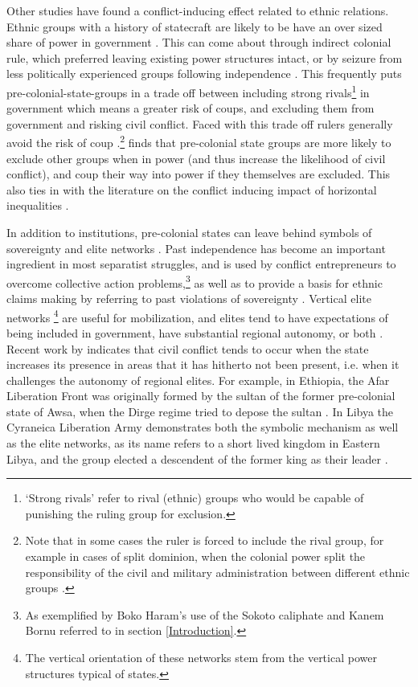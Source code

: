 Other studies have found a conflict-inducing effect related to ethnic relations.
Ethnic groups with a history of statecraft are likely to be have an over sized
share of power in government \citep{Wucherpfennig2016}. This can come about
through indirect colonial rule, which preferred leaving existing power
structures intact, or by seizure from less politically experienced groups
following independence \citep{Paine2019}. This frequently puts
pre-colonial-state-groups in a trade off between including strong
rivals\footnote{`Strong rivals' refer to rival (ethnic) groups who would be
capable of punishing the ruling group for exclusion.} in government which means
a greater risk of coups, and excluding them from government and risking civil
conflict. Faced with this trade off rulers generally avoid the risk of coup
\citep{Paine2019, Powell_2014, Roessler_2011}.\footnote{Note that in some cases
	the ruler is forced to include the rival group, for example in cases of
split dominion, when the colonial power split the responsibility of the civil
and military administration between different ethnic groups \citep{Paine2019}.}
\citet{Paine2019} finds that pre-colonial state groups are more likely to
exclude other groups when in power (and thus increase the likelihood of civil
conflict), and coup their way into power if they themselves are excluded. This
also ties in with the literature on the conflict inducing impact of horizontal
inequalities \citep{CEDERMAN_2011}.

In addition to institutions, pre-colonial states can leave behind symbols of
sovereignty and elite networks \citep{Wishman}. Past independence has become an
important ingredient in most separatist struggles, and is used by conflict
entrepreneurs to overcome collective action problems,\footnote{As exemplified by
Boko Haram's use of the Sokoto caliphate and Kanem Bornu referred to in section
\ref{Introduction}.} as well as to provide a basis for ethnic claims making by
referring to past violations of sovereignty \citep{Ahram2019, Shelef2016}.
Vertical elite networks \footnote{The vertical orientation of these networks
stem from the vertical power structures typical of states.} are useful for
mobilization, and elites tend to have expectations of being included in
government, have substantial regional autonomy, or both \citep{Wishman}. Recent
work by \citet{Ying_2020} indicates that civil conflict tends to occur when the
state increases its presence in areas that it has hitherto not been present,
i.e. when it challenges the autonomy of regional elites. For example, in
Ethiopia, the Afar Liberation Front was originally formed by the sultan of the
former pre-colonial state of Awsa, when the Dirge regime tried to depose the
sultan \citep{Shehim1985, Hanfare2011}.  In Libya the Cyraneica Liberation Army
demonstrates both the symbolic mechanism as well as the elite networks, as its
name refers to a short lived kingdom in Eastern Libya, and the group elected a
descendent of the former king as their leader \citep{Ahram2019}. 

